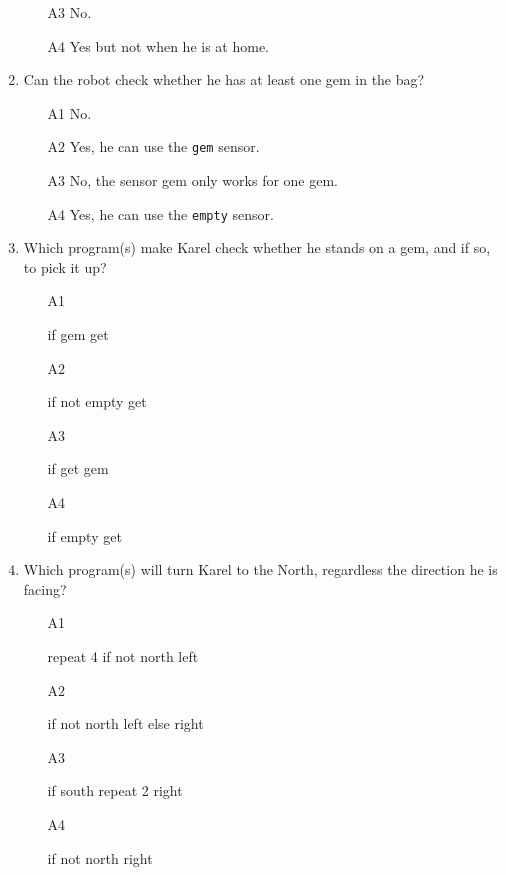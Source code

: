 \begin{enumerate}
\begin{enumerate}
\item[A3] No.
\item[A4] Yes but not when he is at home.
\end{enumerate}
\item Can the robot check whether he has at least one gem in the bag?
\begin{enumerate}
\item[A1] No.
\item[A2] Yes, he can use the {\tt gem} sensor. 
\item[A3] No, the sensor gem only works for one gem.
\item[A4] Yes, he can use the {\tt empty} sensor.
\end{enumerate}
\item Which program(s) make Karel check whether he stands on a gem, and if so, to pick it up?
\begin{enumerate}
\item[A1] 
\begin{bluecode}
if gem
    get
\end{bluecode}
\item[A2] 
\begin{bluecode}
if not empty
    get
\end{bluecode}
\item[A3] 
\begin{bluecode}
if get
    gem
\end{bluecode}
\item[A4] 
\begin{bluecode}
if empty
    get
\end{bluecode}
\end{enumerate}
\item Which program(s) will turn Karel to the North, regardless the direction he is facing?
\begin{enumerate}
\item[A1] 
\begin{bluecode}
repeat 4
    if not north 
        left
\end{bluecode}
\item[A2] 
\begin{bluecode}
if not north 
    left
else 
    right
\end{bluecode}
\item[A3] 
\begin{bluecode}
if south
    repeat 2
        right
\end{bluecode}
\item[A4] 
\begin{bluecode}
if not north 
    right
\end{bluecode}
\end{enumerate}
\end{enumerate}


